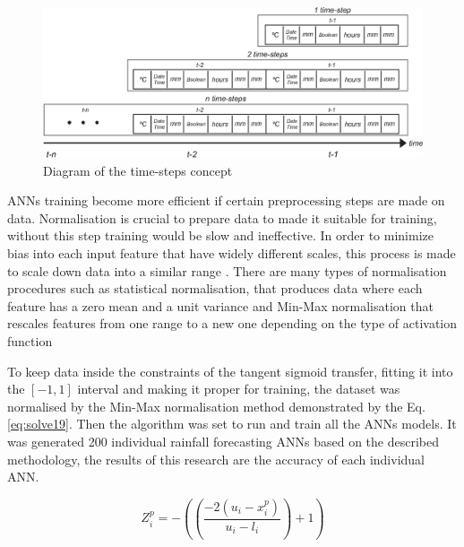 \begin{figure}[htb!]
 \centering
 \includegraphics[scale=0.88]{capitulo_2/time_steps}
 \caption{Diagram of the time-steps concept }
 \label{img:figure3}
\end{figure}

\newpage

ANNs training become more efficient if certain preprocessing steps are made on data. Normalisation is crucial to prepare data to made it suitable for training, without this step training would be slow and ineffective. In order to minimize bias into each input feature that have widely different scales, this process is made to scale down data into a similar range \cite{yaldi2009improving}. There are many types of normalisation procedures such as statistical normalisation, that produces data where each feature has a zero mean and a unit variance and Min-Max normalisation that rescales features from one range to a new one depending on the type of activation function    

To keep data inside the constraints of the tangent sigmoid transfer, fitting it into the $[-1, 1]$ interval and making it proper for training, the dataset was normalised by the Min-Max normalisation method demonstrated by the Eq. \ref{eq:solve19}. Then the algorithm was set to run and train all the ANNs models. It was generated 200 individual rainfall forecasting ANNs based on the described methodology, the results of this research are the accuracy of each individual ANN.

\begin{equation}
 \label{eq:solve19}
 Z_i^p = -((\frac{-2(u_i - x_i^p)}{u_i - l_i}) + 1)
\end{equation}

%

